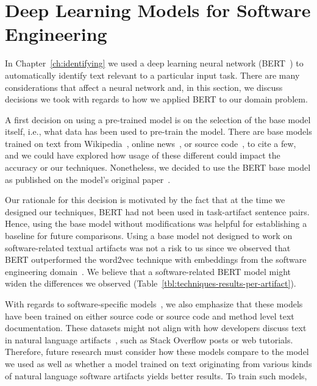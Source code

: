 


\section{Deep Learning Models for Software Engineering}
\label{cp7:deep-learning}




In Chapter~\ref{ch:identifying} we used a deep learning neural network (BERT~\cite{Devlin2018Bert})
to automatically identify text relevant to a particular input task. There are many considerations 
that affect a neural network and, in this section, we discuss decisions we took 
with regards to how we applied BERT to our domain problem. 



A first decision on using a pre-trained model is on the selection of the base model itself, i.e., what data has been used to pre-train the model. 
There are base models trained on text from Wikipedia~\cite{Devlin2018Bert},  online news~\cite{peters2018elmo}, 
or source code~\cite{feng2020-codebert}, to  cite a few,
and we could have explored how usage of these different could impact the accuracy or our 
techniques. Nonetheless, we decided to use 
the BERT base model as published on the model's original paper~\cite{Devlin2018Bert}.


Our rationale for this decision is motivated by the fact that at the time we designed our techniques, 
BERT had not been used in task-artifact sentence pairs. Hence, using the base model without modifications
was helpful for establishing a baseline for future comparisons.
Using a base model not designed to work on software-related textual artifacts 
was not a risk to us since we observed that BERT outperformed 
the word2vec technique with embeddings from the software engineering domain~\cite{Efstathiou2018}.
We believe that a software-related BERT model might
widen the differences we observed (Table~\ref{tbl:techniques-results-per-artifact}).


With regards to software-specific models~\cite{feng2020-codebert, li2019neural}, we also emphasize 
that these models have been trained on either source code or source code and method level text documentation. 
These datasets might not align with how developers discuss text in natural language artifacts~\cite{arya2020}, such 
as Stack Overflow posts or web tutorials. Therefore, future research must consider how these models compare 
to the model we used as well as whether a model trained on text originating from various kinds of 
natural language software artifacts yields better results.
To train such models, 



